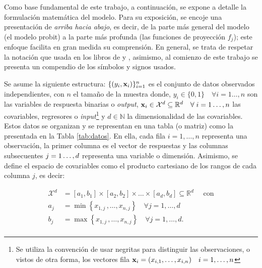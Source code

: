 \documentclass[../Main/Main.tex]{subfiles}
\begin{document}
Como base fundamental de este trabajo, a continuación, se expone a detalle la formulación matemática del modelo.  Para su exposición, se encoje una presentación de \textit{arriba hacia abajo}, es decir, de la parte más general del modelo (el modelo probit) a la parte más profunda (las funciones de proyección $f_j$); este enfoque facilita en gran medida su comprensión. En general, se trata de respetar la notación que usada en los libros de  \citet{hastie2008elements} y \citet{james2013introduction}, asimismo, al comienzo de este trabajo se presenta un compendio de los símbolos y signos usados.


Se asume la siguiente estructura: $\{(y_i,\mathbf{x}_i)\}_{i = 1}^n$ es el conjunto de datos observados independientes, con $n$ el tamaño de la muestra donde, $y_i \in \{0,1\}\quad \forall i = 1\ldots,n$ son las  variables de respuesta binarias o \textit{output}, $\mathbf{x}_i \in \mathcal{X}^d \subseteq \mathbb{R}^d \quad \forall \; i = 1\ldots,n$ las covariables, regresores o \textit{input}\footnote{Se utiliza la convención de usar negritas para distinguir las observaciones, o vistos de otra forma, los vectores fila $\mathbf{x}_i = (x_{i,1},\ldots,x_{i,n}) \quad i = 1,\ldots,n$} y $d \in \mathbb{N}$ la dimensionalidad de las covariables. Estos datos se organizan y se representan en una tabla (o matriz) como la presentada en la Tabla \ref{tab:datos}. En ella, cada fila $i = 1,\ldots,n$ representa una observación, la primer columna es el vector de respuestas y las columnas subsecuentes $j = 1\ldots,d$ representa una variable o dimensión. Asimismo, se define el espacio de covariables como el producto cartesiano de los rangos de cada columna $j$, es decir:

\begin{align*}
	\mathcal{X}^d &= [a_1,b_1]\times[a_2,b_2]\times\ldots\times[a_d,b_d] \subseteq \mathbb{R}^d \quad \text{ con} \\ 
	a_j &= \min\left\{x_{1,j}\, ,\ldots,x_{n,j}\right\} \quad \forall j = 1,\ldots,d \\
	b_j &= \max\left\{x_{1,j}\, ,\ldots,x_{n,j}\right\} \quad \forall j = 1,\ldots,d. \\
\end{align*}
\end{document}
